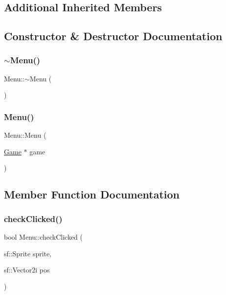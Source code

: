 \subsection*{Additional Inherited Members}


\subsection{Constructor \& Destructor Documentation}
\mbox{\label{class_menu_a831387f51358cfb88cd018e1777bc980}} 
\subsubsection{\texorpdfstring{$\sim$\+Menu()}{~Menu()}}
{\footnotesize\ttfamily Menu\+::$\sim$\+Menu (\begin{DoxyParamCaption}{ }\end{DoxyParamCaption})}

\mbox{\label{class_menu_a91ec4975ad2aced80cd524a179dd7af1}} 
\subsubsection{\texorpdfstring{Menu()}{Menu()}}
{\footnotesize\ttfamily Menu\+::\+Menu (\begin{DoxyParamCaption}\item[{\hyperlink{class_game}{Game} $\ast$}]{game }\end{DoxyParamCaption})}



\subsection{Member Function Documentation}
\mbox{\label{class_menu_a1b4d7af621c036afa3d9758e8accbc16}} 
\subsubsection{\texorpdfstring{check\+Clicked()}{checkClicked()}}
{\footnotesize\ttfamily bool Menu\+::check\+Clicked (\begin{DoxyParamCaption}\item[{sf\+::\+Sprite}]{sprite,  }\item[{sf\+::\+Vector2i}]{pos }\end{DoxyParamCaption})}

